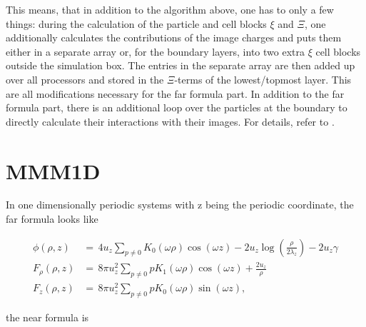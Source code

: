 This means, that in addition to the algorithm above, one has to only a
few things: during the calculation of the particle and cell blocks
$\xi$ and $\Xi$, one additionally calculates the contributions of the
image charges and puts them either in a separate array or, for the
boundary layers, into two extra $\xi$ cell blocks outside the
simulation box. The entries in the separate array are then added up
over all processors and stored in the $\Xi$-terms of the
lowest/topmost layer. This are all modifications necessary for the far
formula part. In addition to the far formula part, there is an
additional loop over the particles at the boundary to directly
calculate their interactions with their images.  For details, refer to
\citet{tyagi07a}.

\section{MMM1D}

In one dimensionally periodic systems with z being the periodic
coordinate, the far formula looks like

\[ \begin{array}{rl} \phi(\rho,z) &=\, 4 u_z\sum_{p\neq 0}
  K_0(\omega\rho)\cos(\omega z) - 2u_z\log(\frac{\rho}{2\lambda_z}) -
  2u_z\gamma\\ F_\rho(\rho,z) &=\, 8\pi u_z^2\sum_{p\neq 0} p
  K_1(\omega\rho)\cos(\omega z) + \frac{2 u_z}{\rho}\\ F_z(\rho,z)
  &=\, 8\pi u_z^2 \sum_{p\neq 0} pK_0(\omega\rho)\sin(\omega z),
\end{array} \]

the near formula is

